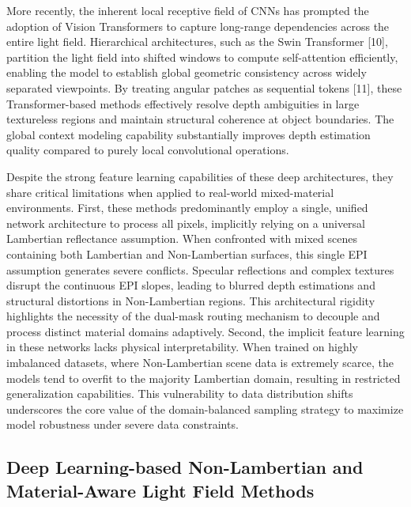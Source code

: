 More recently, the inherent local receptive field of CNNs has prompted the adoption of Vision Transformers to capture long-range dependencies across the entire light field. Hierarchical architectures, such as the Swin Transformer [10], partition the light field into shifted windows to compute self-attention efficiently, enabling the model to establish global geometric consistency across widely separated viewpoints. By treating angular patches as sequential tokens [11], these Transformer-based methods effectively resolve depth ambiguities in large textureless regions and maintain structural coherence at object boundaries. The global context modeling capability substantially improves depth estimation quality compared to purely local convolutional operations.

Despite the strong feature learning capabilities of these deep architectures, they share critical limitations when applied to real-world mixed-material environments. First, these methods predominantly employ a single, unified network architecture to process all pixels, implicitly relying on a universal Lambertian reflectance assumption. When confronted with mixed scenes containing both Lambertian and Non-Lambertian surfaces, this single EPI assumption generates severe conflicts. Specular reflections and complex textures disrupt the continuous EPI slopes, leading to blurred depth estimations and structural distortions in Non-Lambertian regions. This architectural rigidity highlights the necessity of the dual-mask routing mechanism to decouple and process distinct material domains adaptively. Second, the implicit feature learning in these networks lacks physical interpretability. When trained on highly imbalanced datasets, where Non-Lambertian scene data is extremely scarce, the models tend to overfit to the majority Lambertian domain, resulting in restricted generalization capabilities. This vulnerability to data distribution shifts underscores the core value of the domain-balanced sampling strategy to maximize model robustness under severe data constraints.

\subsection{Deep Learning-based Non-Lambertian and Material-Aware Light Field Methods}

